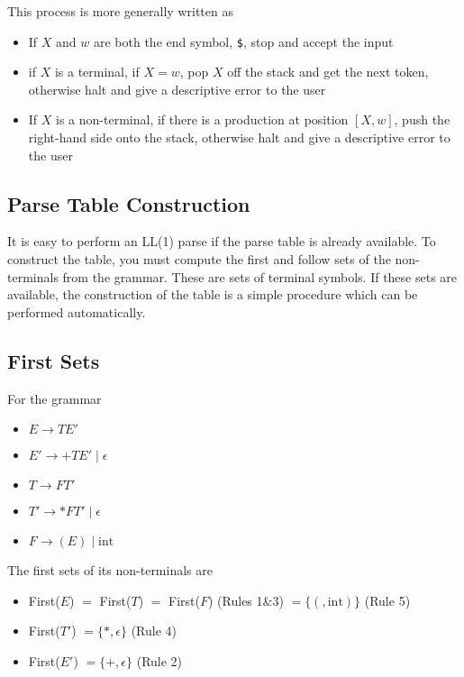 This process is more generally written as
\begin{itemize}
  \item If $X$ and $w$ are both the end symbol, \verb`$`, stop and accept the input
  \item if $X$ is a terminal, if $X = w$, pop $X$ off the stack and get the next token, otherwise halt and give a
   descriptive error to the user
  \item If $X$ is a non-terminal, if there is a production at position $[X, w]$, push the right-hand side onto the stack,
   otherwise halt and give a descriptive error to the user
\end{itemize}

\subsection*{Parse Table Construction}

It is easy to perform an LL(1) parse if the parse table is already available. To construct the table, you must compute
 the first and follow sets of the non-terminals from the grammar. These are sets of terminal symbols. If these sets are
 available, the construction of the table is a simple procedure which can be performed automatically.

\subsection*{First Sets}

For the grammar
\begin{itemize}
  \item $E \rightarrow TE'$
  \item $E' \rightarrow +TE' \mid \epsilon$
  \item $T \rightarrow FT'$
  \item $T' \rightarrow *FT' \mid \epsilon$
  \item $F \rightarrow (E) \mid \mathrm{int}$
\end{itemize}
The first sets of its non-terminals are
\begin{itemize}
  \item First($E$) $=$ First($T$) $=$ First($F$) (Rules 1\&3) $= \{(, \mathrm{int})\}$ (Rule 5)
  \item First($T'$) $= \{*, \epsilon\}$ (Rule 4)
  \item First($E'$) $= \{+, \epsilon\}$ (Rule 2)
\end{itemize}

